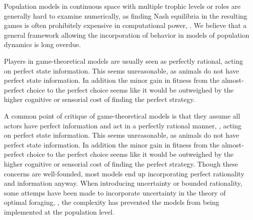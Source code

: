 Population models in continuous space with multiple trophic levels or roles are generally hard to examine numerically, as finding Nash equilibria in the resulting games is often prohibitely expensive in computational power, \citep{empirical_trait,abrams2010implications,pinti2019trophic}. We believe that a general framework allowing the incorporation of behavior in models of population dynamics is long overdue.

Players in game-theoretical models are usually seen as perfectly rational, acting on perfect state information. This seems unreasonable, as animals do not have perfect state information. In addition the minor gain in fitness from the almost-perfect choice to the perfect choice seems like it would be outweighed by the higher cognitive or sensorial cost of finding the perfect strategy.


A common point of critique of game-theoretical models is that they assume all actors have perfect information and act in a perfectly rational manner, \citep{jones1999bounded}, acting on perfect state information. This seems unreasonable, as animals do not have perfect state information. In addition the minor gain in fitness from the almost-perfect choice to the perfect choice seems like it would be outweighed by the higher cognitive or sensorial cost of finding the perfect strategy.
Though these concerns are well-founded, most models end up incorporating perfect rationality and information anyway. When introducing uncertainty or bounded rationality, some attemps have been made to incorporate uncertainty in the theory of optimal foraging, \citep{bayesianmodel, thuijsman1995automata,gigerenzer2001rethinking}, the complexity has prevented the models from being implemented at the population level.

